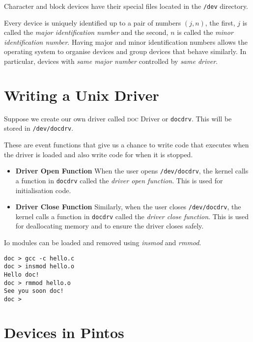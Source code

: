 Character and block devices have their special files located in the \lstinline{/dev} directory.


\frmrule

Every device is uniquely identified up to a pair of numbers $(j,n)$,
the first, $j$ is called the \textit{major identification number} 
and the second, $n$ is called the \textit{minor identification number}. 
Having major and minor identification numbers allows the operating system 
to organise devices and group devices that behave similarly. In particular, 
devices with \textit{same major number} controlled by \textit{same driver}.


\section{Writing a Unix Driver}

Suppose we create our own driver called \textsc{doc} Driver or \lstinline{docdrv}. 
This will be stored in \lstinline{/dev/docdrv}. 

These are event functions that give us a chance 
to write code that executes when the driver is loaded and also write code 
for when it is stopped. 

\begin{itemize}   
\renewcommand{\labelitemi}{$\Box$}
\item \textbf{Driver Open Function} When the user opens \lstinline{/dev/docdrv}, 
the kernel calls a function in \lstinline{docdrv} called the
\textit{driver open function}. This is used for initialisation code.
\item \textbf{Driver Close Function} Similarly, when the user closes \lstinline{/dev/docdrv}, 
the kernel calls a function in \lstinline{docdrv} called the 
\textit{driver close function}. This is used for deallocating memory and to ensure 
the driver closes safely.
\end{itemize}

\frumrule

Io modules can be loaded and removed using \textit{insmod} and \textit{rmmod}.

\begin{lstlisting}
doc > gcc -c hello.c
doc > insmod hello.o
Hello doc!
doc > rmmod hello.o
See you soon doc!
doc >
\end{lstlisting}


\section{Devices in Pintos}